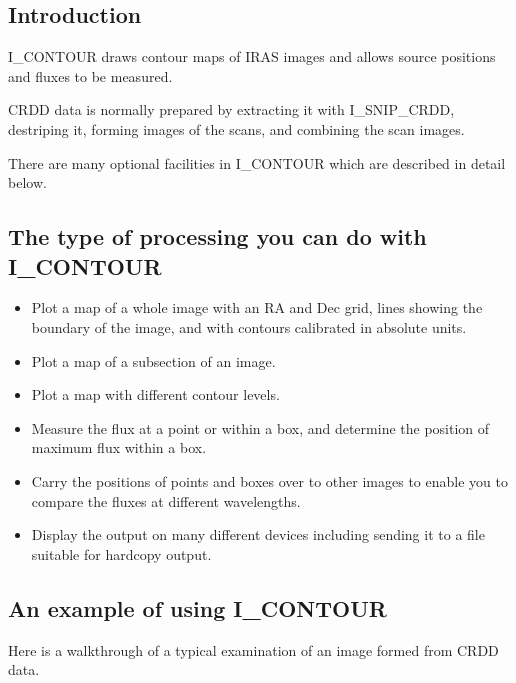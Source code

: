 \subsection {Introduction}

I\_CONTOUR draws contour maps of IRAS images and allows source positions and 
fluxes to be measured. 

CRDD data is normally prepared by extracting it with I\_SNIP\_CRDD, destriping 
it, forming images of the scans, and combining the scan images. 


There are many optional facilities in I\_CONTOUR which are described in detail 
below.

\subsection{The type of processing you can do with I\_CONTOUR}

\begin{itemize}

\item Plot a map of a whole image with an RA and Dec grid, lines showing the
boundary of the image, and with contours calibrated in absolute units.

\item Plot a map of a subsection of an image.

\item Plot a map with different contour levels.

\item Measure the flux at a point or within a box, and determine the position of
maximum flux within a box.

\item Carry the positions of points and boxes over to other images to enable
you to compare the fluxes at different wavelengths.

\item Display the output on many different devices including sending it to a
file suitable for hardcopy output.
\end{itemize}

\subsection{An example of using I\_CONTOUR}

Here is a walkthrough of a typical examination of an image formed from CRDD
data.

